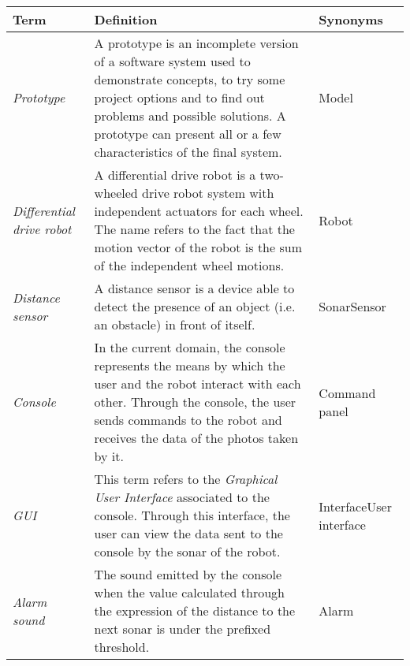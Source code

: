 \documentclass[a4paper]{article}
\begin{document}
\def\arraystretch{1.8}
\begin{tabular}{ | m{3cm} | m{9cm} | m{3cm} | }

    \hline
    
	\textbf{Term} & \textbf{Definition} & \textbf{Synonyms}\\ 
	
	\hline
	
	\textit{Prototype} & A prototype is an incomplete version of a software system used to demonstrate concepts, to try some project options and to find out problems and possible solutions. A prototype can present all or a few characteristics of the final system. & Model\\
	
	\hline
	
	\textit{Differential drive robot} & A differential drive robot is a two-wheeled drive robot system with independent actuators for each wheel. The name refers to the fact that the motion vector of the robot is the sum of the independent wheel motions. & Robot\\
	
	\hline
	
	\textit{Distance sensor} & A distance sensor is a device able to detect the presence of an object (i.e. an obstacle) in front of itself. & Sonar\newline Sensor\\
		
	\hline
	
	\textit{Console} & In the current domain, the console represents the means by which the user and the robot interact with each other. Through the console, the user sends commands to the robot and receives the data of the photos taken by it. & Command panel\\
	
	\hline
	
	\textit{GUI} & This term refers to the \textit{Graphical User Interface} associated to the console. Through this interface, the user can view the data sent to the console by the sonar of the robot. & Interface\newline User interface\\
	
	\hline
	
	\textit{Alarm sound} & The sound emitted by the console when the value calculated through the expression of the distance to the next sonar is under the prefixed threshold. & Alarm\\
	
	\hline
	

\end{tabular}
\end{document}
